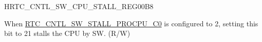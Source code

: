 \begin{register}{H}{RTC\_CNTL\_SW\_CPU\_STALL\_REG}{\hexprefix{}00B8}\label{regdesc:RTCCNTLSWCPUSTALLREG}
%
%
\regnewline%
\begin{regdesc}\begin{reglist}
\label{fielddesc:RTCCNTLSWSTALLPROCPUC1}\item [RTC\_CNTL\_SW\_STALL\_PROCPU\_C1] When \hyperref[fielddesc:RTCCNTLSWSTALLPROCPUC0]{RTC\_CNTL\_SW\_STALL\_PROCPU\_C0} is configured to \hexprefix{}2, setting this bit to \hexprefix{}21 stalls the CPU by SW. (R/W)
\end{reglist}\end{regdesc}
\end{register}


